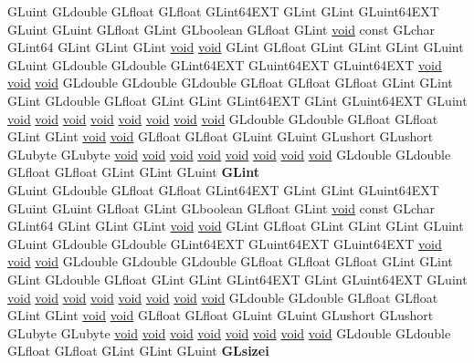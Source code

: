\begin{DoxyCompactItemize}
\begin{tabbing}
\>GLuint GLdouble GLfloat GLfloat GLint64EXT GLint GLint GLuint64EXT GLuint GLuint GLfloat GLint GLboolean GLfloat GLint \hyperlink{interfacevoid}{void} const GLchar GLint64 GLint GLint GLint \hyperlink{interfacevoid}{void} \hyperlink{interfacevoid}{void} GLint GLfloat GLint GLint GLint GLuint GLuint GLdouble GLdouble GLint64EXT GLuint64EXT GLuint64EXT \hyperlink{interfacevoid}{void} \hyperlink{interfacevoid}{void} \hyperlink{interfacevoid}{void} GLdouble GLdouble GLdouble GLfloat GLfloat GLfloat GLint GLint GLint GLdouble GLfloat GLint GLint GLint64EXT GLint GLuint64EXT GLuint \hyperlink{interfacevoid}{void} \hyperlink{interfacevoid}{void} \hyperlink{interfacevoid}{void} \hyperlink{interfacevoid}{void} \hyperlink{interfacevoid}{void} \hyperlink{interfacevoid}{void} \hyperlink{interfacevoid}{void} \hyperlink{interfacevoid}{void} GLdouble GLdouble GLfloat GLfloat GLint GLint \hyperlink{interfacevoid}{void} \hyperlink{interfacevoid}{void} GLfloat GLfloat GLuint GLuint GLushort GLushort GLubyte GLubyte \hyperlink{interfacevoid}{void} \hyperlink{interfacevoid}{void} \hyperlink{interfacevoid}{void} \hyperlink{interfacevoid}{void} \hyperlink{interfacevoid}{void} \hyperlink{interfacevoid}{void} \hyperlink{interfacevoid}{void} \hyperlink{interfacevoid}{void} GLdouble GLdouble GLfloat GLfloat GLint GLint GLuint {\bfseries GLint}\\
\>GLuint GLdouble GLfloat GLfloat GLint64EXT GLint GLint GLuint64EXT GLuint GLuint GLfloat GLint GLboolean GLfloat GLint \hyperlink{interfacevoid}{void} const GLchar GLint64 GLint GLint GLint \hyperlink{interfacevoid}{void} \hyperlink{interfacevoid}{void} GLint GLfloat GLint GLint GLint GLuint GLuint GLdouble GLdouble GLint64EXT GLuint64EXT GLuint64EXT \hyperlink{interfacevoid}{void} \hyperlink{interfacevoid}{void} \hyperlink{interfacevoid}{void} GLdouble GLdouble GLdouble GLfloat GLfloat GLfloat GLint GLint GLint GLdouble GLfloat GLint GLint GLint64EXT GLint GLuint64EXT GLuint \hyperlink{interfacevoid}{void} \hyperlink{interfacevoid}{void} \hyperlink{interfacevoid}{void} \hyperlink{interfacevoid}{void} \hyperlink{interfacevoid}{void} \hyperlink{interfacevoid}{void} \hyperlink{interfacevoid}{void} \hyperlink{interfacevoid}{void} GLdouble GLdouble GLfloat GLfloat GLint GLint \hyperlink{interfacevoid}{void} \hyperlink{interfacevoid}{void} GLfloat GLfloat GLuint GLuint GLushort GLushort GLubyte GLubyte \hyperlink{interfacevoid}{void} \hyperlink{interfacevoid}{void} \hyperlink{interfacevoid}{void} \hyperlink{interfacevoid}{void} \hyperlink{interfacevoid}{void} \hyperlink{interfacevoid}{void} \hyperlink{interfacevoid}{void} \hyperlink{interfacevoid}{void} GLdouble GLdouble GLfloat GLfloat GLint GLint GLuint {\bfseries GLsizei}\\

\end{tabbing}
\end{DoxyCompactItemize}
